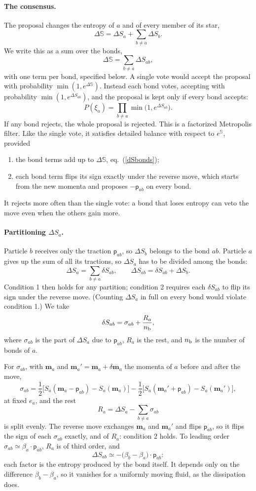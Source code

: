 \documentclass[11pt,aps,preprint,nofootinbib,superscriptaddress,tightenlines]{revtex4-2}
\def\st{\begin{equation}}
\def\stp{\end{equation}}
\def\Eq#1{eq.~(\ref{#1})}
\newcommand{\pf}{\bm{\mathsf p}}
\let\oldparagraph\paragraph
\renewcommand{\paragraph}{\par\bigskip\oldparagraph}
\begin{document}
\paragraph{The consensus.}  The proposal changes the entropy of $a$ and of every
member of its star,
\st
\Delta\mathbb S=\Delta S_a+\sum_{b\neq a}\Delta S_b .
\label{dStot}
\stp
We write this as a sum over the bonds,
\st
\Delta\mathbb S=\sum_{b\neq a}\Delta S_{ab} ,
\label{dSbonds}
\stp
with one term per bond, specified below.  A single vote would accept the
proposal with probability $\min(1,e^{\Delta\mathbb S})$.  Instead each bond votes,
accepting with probability $\min(1,e^{\Delta S_{ab}})$, and the proposal is kept
only if every bond accepts:
\st
P(\xi_a)=\prod_{b\neq a}\min\big(1,e^{\Delta S_{ab}}\big).
\label{Pfact}
\stp
If any bond rejects, the whole proposal is rejected.  This is a factorized
Metropolis filter.  Like the single vote, it satisfies detailed balance with
respect to $e^{\mathbb S}$, provided
\begin{enumerate}
\item the bond terms add up to $\Delta\mathbb S$, \Eq{dSbonds};
\item each bond term flips its sign exactly under the reverse move, which
  starts from the new momenta and proposes $-\pf_{ab}$ on every bond.
\end{enumerate}
It rejects more often than the single vote: a bond that loses entropy can
veto the move even when the others gain more.

\paragraph{Partitioning $\Delta S_a$.}  Particle $b$ receives only the traction
$\pf_{ab}$, so $\Delta S_b$ belongs to the bond $ab$.  Particle $a$ gives up the sum
of all its tractions, so $\Delta S_a$ has to be divided among the bonds:
\st
\Delta S_a=\sum_{b\neq a}\delta S_{ab},\qquad
\Delta S_{ab}=\delta S_{ab}+\Delta S_b .
\label{dSab}
\stp
Condition 1 then holds for any partition; condition 2 requires each
$\delta S_{ab}$ to flip its sign under the reverse move.  (Counting $\Delta S_a$ in
full on every bond would violate condition 1.)  We take
\st
\delta S_{ab}=\sigma_{ab}+\frac{R_a}{n_{\rm b}} ,
\stp
where $\sigma_{ab}$ is the part of $\Delta S_a$ due to $\pf_{ab}$, $R_a$ is the rest, and
$n_{\rm b}$ is the number of bonds of $a$.

For $\sigma_{ab}$, with $\bm m_a$ and
$\bm m_a'=\bm m_a+\delta\bm m_a$ the momenta of $a$ before and after the move,
\st
\sigma_{ab}=\frac12\Big[S_a(\bm m_a-\pf_{ab})-S_a(\bm m_a)\Big]
-\frac12\Big[S_a(\bm m_a'+\pf_{ab})-S_a(\bm m_a')\Big],
\label{sigmaab}
\stp
at fixed $e_a$, and the rest
\st
R_a=\Delta S_a-\sum_{b\neq a}\sigma_{ab}
\stp
is split evenly.  The reverse move exchanges $\bm m_a$ and $\bm m_a'$ and flips
$\pf_{ab}$, so it flips the sign of each $\sigma_{ab}$ exactly, and of $R_a$:
condition 2 holds.  To leading order $\sigma_{ab}\simeq\beta_a\cdot\pf_{ab}$, $R_a$ is of
third order, and
\st
\Delta S_{ab}\simeq-\big(\beta_b-\beta_a\big)\cdot\pf_{ab} :
\stp
each factor is the entropy produced by the bond itself.  It depends only on the
difference $\beta_b-\beta_a$, so it vanishes for a uniformly moving fluid, as the
dissipation does.
\end{document}
